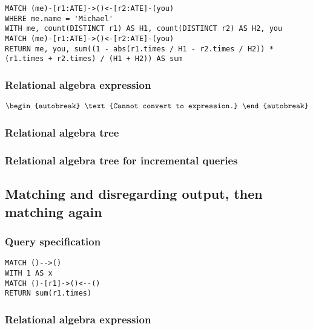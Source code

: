 \begin{lstlisting}
MATCH (me)-[r1:ATE]->()<-[r2:ATE]-(you)
WHERE me.name = 'Michael'
WITH me, count(DISTINCT r1) AS H1, count(DISTINCT r2) AS H2, you
MATCH (me)-[r1:ATE]->()<-[r2:ATE]-(you)
RETURN me, you, sum((1 - abs(r1.times / H1 - r2.times / H2)) * (r1.times + r2.times) / (H1 + H2)) AS sum
\end{lstlisting}

\subsubsection*{Relational algebra expression}

\begin{align*}
\begin{autobreak}
\text{Cannot convert to expression.}
\end{autobreak}
\end{align*}

\subsubsection*{Relational algebra tree}


\subsubsection*{Relational algebra tree for incremental queries}


\subsection{Matching and disregarding output, then matching again}

\subsubsection*{Query specification}

\begin{lstlisting}
MATCH ()-->()
WITH 1 AS x
MATCH ()-[r1]->()<--()
RETURN sum(r1.times)
\end{lstlisting}

\subsubsection*{Relational algebra expression}

